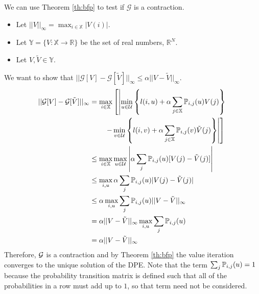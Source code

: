 We can use Theorem \ref{th:bfp} to test if $\mathcal{G}$ is a contraction.
\begin{itemize}
\item Let $||V||_\infty = \max_{i\in\mathbb{X}}|V(i)|$.
\item Let $\mathbb{Y}=\{V:\mathbb{X}\to\mathbb{R}\}$ be the set of real numbers, $\mathbb{R}^N$.
\item Let $V,\tilde{V}\in\mathbb{Y}$.
\end{itemize}
We want to show that $||\mathcal{G}[V]-\mathcal{G}[\tilde{V}]||_\infty\leq\alpha||V-\tilde{V}||_\infty$.
\begin{align*}
||\mathcal{G}[V]-\mathcal{G}[\tilde{V}]||_\infty &= \max_{i\in\mathbb{X}}\left[\left|\min_{u\in\mathcal{U}}\left\lbrace l(i,u)+\alpha\sum_{j\in\mathbb{X}}\mathbb{P}_{i,j}(u)V(j)\right\rbrace \right.\right. \\
&\left.\left.\qquad - \min_{v\in\mathcal{U}}\left\lbrace l(i,v)+\alpha\sum_{j\in\mathbb{X}}\mathbb{P}_{i,j}(v)\tilde{V}(j)\right\rbrace \right|\right] \\
&\leq \max_{i\in\mathbb{X}}\max_{u\in\mathcal{U}}\left|\alpha\sum_j\mathbb{P}_{i,j}(u)[V(j)-\tilde{V}(j)]\right| \\
&\leq \max_{i,u}\alpha\sum_j\mathbb{P}_{i,j}(u)|V(j)-\tilde{V}(j)| \\
&\leq \alpha\max_{i,u}\sum_j\mathbb{P}_{i,j}(u)||V-\tilde{V}||_\infty \\
&= \alpha||V-\tilde{V}||_\infty\max_{i,u}\sum_j\mathbb{P}_{i,j}(u) \\
&= \alpha||V-\tilde{V}||_\infty
\end{align*}
Therefore, $\mathcal{G}$ is a contraction and by Theorem \ref{th:bfp} the value iteration converges to the unique solution of the DPE. Note that the term $\sum_j\mathbb{P}_{i,j}(u)=1$ because the probability transition matrix is defined such that all of the probabilities in a row must add up to $1$, so that term need not be considered.

